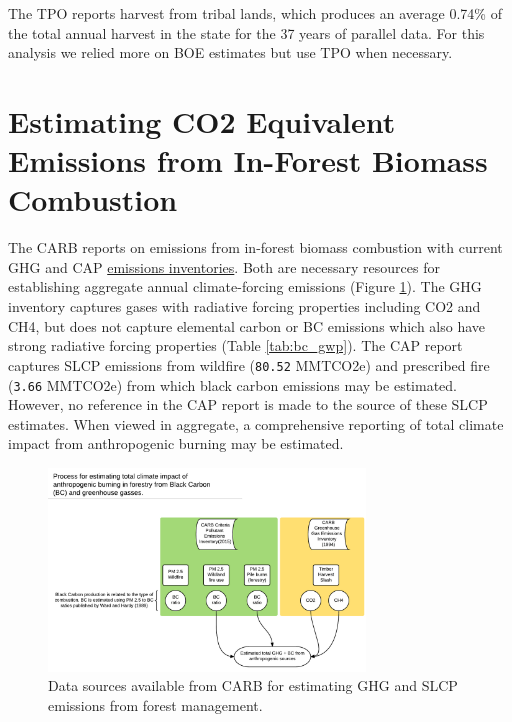 \documentclass[a4paper,titlepage]{article}
\begin{document}
The \ac{TPO} reports harvest from tribal lands, which produces an average 0.74\% of the total annual harvest in the state for the 37 years of parallel data. For
this analysis we relied more on \ac{BOE} estimates but use \ac{TPO} when necessary. 

\section{Estimating CO2 Equivalent Emissions from In-Forest Biomass Combustion}
\label{sec:orgheadline10}


The \ac{CARB} reports on emissions from in-forest biomass combustion with current \ac{GHG} and \ac{CAP} \href{http://www.arb.ca.gov/ei/ei.htm}{emissions inventories}. Both are necessary resources for establishing aggregate annual climate-forcing emissions (Figure \ref{fig:burn_diag}). 
The GHG inventory captures
gases with radiative forcing properties including CO2 and CH4, but does not capture elemental
carbon or \ac{BC} emissions which also have strong radiative
forcing properties (Table \ref{tab:bc_gwp}). The \citet{CaliforniaAirResourcesBoard2015,CaliforniaAirResourcesBoard2016}
\ac{CAP} report captures \ac{SLCP} emissions from wildfire
(\texttt{80.52} MMTCO2e) and prescribed fire
(\texttt{3.66} MMTCO2e) from which black carbon emissions may be estimated. However, no reference in the CAP report is made to the source of these
SLCP estimates. When viewed in aggregate, a comprehensive reporting of total climate impact from anthropogenic burning may be estimated. 


\begin{figure}[htb]
\centering
\includegraphics[width=0.75\textwidth]{./graphics/burning.pdf}
\caption{Data sources available from CARB for estimating \ac{GHG} and \ac{SLCP} emissions from forest management. \label{fig:burn_diag}}
\end{figure}
\end{document}
